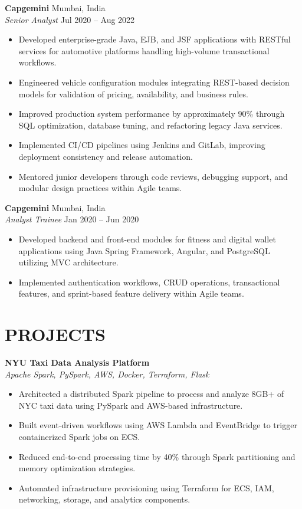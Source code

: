 \documentclass[11pt]{article}
\begin{document}
\textbf{Capgemini} \hfill Mumbai, India \\
\textit{Senior Analyst} \hfill Jul 2020 -- Aug 2022

\begin{itemize}
    \item Developed enterprise-grade Java, EJB, and JSF applications with RESTful services for automotive platforms handling high-volume transactional workflows.
    \item Engineered vehicle configuration modules integrating REST-based decision models for validation of pricing, availability, and business rules.
    \item Improved production system performance by approximately 90\% through SQL optimization, database tuning, and refactoring legacy Java services.
    \item Implemented CI/CD pipelines using Jenkins and GitLab, improving deployment consistency and release automation.
    \item Mentored junior developers through code reviews, debugging support, and modular design practices within Agile teams.
\end{itemize}

\textbf{Capgemini} \hfill Mumbai, India \\
\textit{Analyst Trainee} \hfill Jan 2020 -- Jun 2020

\begin{itemize}
    \item Developed backend and front-end modules for fitness and digital wallet applications using Java Spring Framework, Angular, and PostgreSQL utilizing MVC architecture.
    \item Implemented authentication workflows, CRUD operations, transactional features, and sprint-based feature delivery within Agile teams.
\end{itemize}

\section*{PROJECTS}

\textbf{NYU Taxi Data Analysis Platform} \\
\textit{Apache Spark, PySpark, AWS, Docker, Terraform, Flask}

\begin{itemize}
    \item Architected a distributed Spark pipeline to process and analyze 8GB+ of NYC taxi data using PySpark and AWS-based infrastructure.
    \item Built event-driven workflows using AWS Lambda and EventBridge to trigger containerized Spark jobs on ECS.
    \item Reduced end-to-end processing time by 40\% through Spark partitioning and memory optimization strategies.
    \item Automated infrastructure provisioning using Terraform for ECS, IAM, networking, storage, and analytics components.
\end{itemize}
\end{document}
